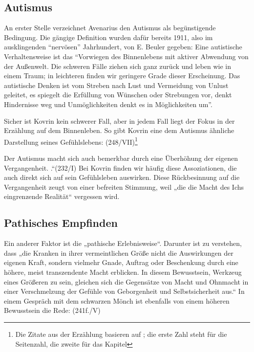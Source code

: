 \documentclass{../../sem_paper}
\begin{document}
\subsection{Autismus}
An erster Stelle verzeichnet Avenarius den Autismus als begünstigende Bedingung. Die gängige
Definition wurden dafür bereits 1911, also im ausklingenden ``nervösen'' Jahrhundert, von E.
Beuler gegeben: Eine autistische Verhaltensweise ist das ``Vorwiegen des Binnenlebens mit aktiver
Abwendung von der Außenwelt. Die schweren Fälle ziehen sich ganz zurück und leben wie in
einem Traum; in leichteren finden wir geringere Grade dieser Erscheinung. Das autistische Denken
ist vom Streben nach Lust und Vermeidung von Unlust geleitet, es spiegelt die Erfüllung von
Wünschen oder Strebungen vor, denkt Hindernisse weg und Unmöglichkeiten denkt es in
Möglichkeiten um''\autocite[38]{avenarius}. 

Sicher ist Kovrin kein schwerer Fall, aber in jedem Fall liegt der Fokus in der
Erzählung auf dem Binnenleben. So gibt Kovrin eine dem Autismus ähnliche Darstellung seines
Gefühlslebens: (248/VII)\footnote{Die Zitate aus der Erzählung basieren auf \autocite{blackmonk} 
; die erste Zahl steht für die Seitenzahl, die zweite für das Kapitel}

Der Autismus macht sich auch bemerkbar durch eine Überhöhung der eigenen Vergangenheit.
.“(232/I) Bei Kovrin finden wir häufig diese Assoziationen,
die auch direkt sich auf sein Gefühlsleben auswirken. Diese Rückbesinnung auf die Vergangenheit
zeugt von einer befreiten Stimmung, weil „die die Macht des Ichs eingrenzende Realität“\autocite[85]{avenarius}
vergessen wird.
\subsection{Pathisches Empfinden}
Ein anderer Faktor ist die „pathische Erlebnisweise“. Darunter ist zu verstehen, dass „die Kranken
in ihrer vermeintlichen Größe nicht die Auswirkungen der eigenen Kraft, sondern vielmehr Gnade,
Auftrag oder Beschenkung durch eine höhere, meist transzendente Macht erblicken. In diesem
Bewusstsein, Werkzeug eines Größeren zu sein, gleichen sich die Gegensätze von Macht und
Ohnmacht in einer Verschmelzung der Gefühle von Geborgenheit und Selbstsicherheit aus.“\autocite[48]{avenarius} In
einem Gespräch mit dem schwarzen Mönch ist ebenfalls von einem höheren Bewusstsein die Rede:
(241f./V)
\end{document}
